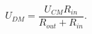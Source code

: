 \begin{equation}
    U_{DM} = \frac {U_{CM}R_{in}} {R_{out} + R_{in}}.
    \label{eq:udminterference}
\end{equation}
